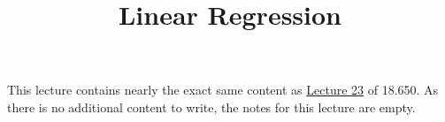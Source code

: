 \title{Linear Regression}



\begin{remark}
    This lecture contains nearly the exact same content
    as \href{/18.650/lectures/23}{Lecture 23} of 18.650.
    As there is no additional content to write,
    the notes for this lecture are empty.
\end{remark}

